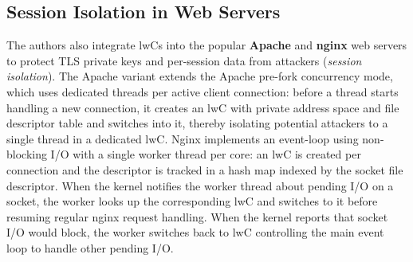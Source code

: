 \documentclass[10pt,twocolumn,a4paper]{article}
\begin{document}
\subsection{Session Isolation in Web Servers}\label{eval:web}
The authors also integrate lwCs into the popular \textbf{Apache} and \textbf{nginx} web servers to protect TLS private keys and per-session data from attackers (\textit{session isolation}).
The Apache variant extends the Apache pre-fork concurrency mode, which uses dedicated threads per active client connection:
before a thread starts handling a new connection, it creates an lwC with private address space and file descriptor table and switches into it, thereby isolating potential attackers to a single thread in a dedicated lwC.
Nginx implements an event-loop using non-blocking I/O with a single worker thread per core:
an lwC is created per connection and the descriptor is tracked in a hash map indexed by the socket file descriptor.
When the kernel notifies the worker thread about pending I/O on a socket, the worker looks up the corresponding lwC and switches to it before resuming regular nginx request handling.
When the kernel reports that socket I/O would block, the worker switches back to lwC controlling the main event loop to handle other pending I/O.
\cite{lwcpaper}

\end{document}
